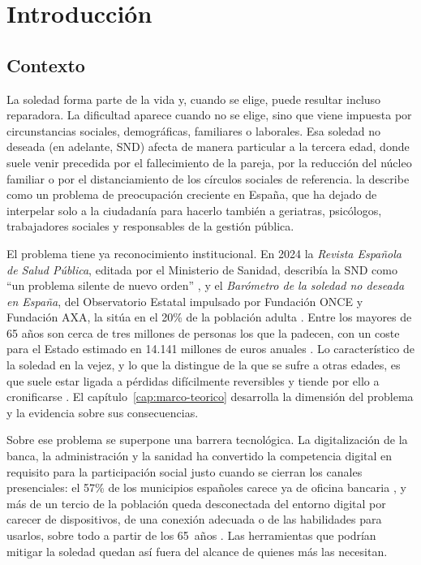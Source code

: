\chapter{Introducción}
\label{cap:introduccion}

\section{Contexto}
\label{contexto}

La soledad forma parte de la vida y, cuando se elige, puede resultar incluso reparadora. La dificultad aparece cuando no se elige, sino que viene impuesta por circunstancias sociales, demográficas, familiares o laborales. Esa soledad no deseada (en adelante, SND) afecta de manera particular a la tercera edad, donde suele venir precedida por el fallecimiento de la pareja, por la reducción del núcleo familiar o por el distanciamiento de los círculos sociales de referencia. \textcite{RuedaEstrada2018} la describe como un problema de preocupación creciente en España, que ha dejado de interpelar solo a la ciudadanía para hacerlo también a geriatras, psicólogos, trabajadores sociales y responsables de la gestión pública.

El problema tiene ya reconocimiento institucional. En 2024 la \textit{Revista Española de Salud Pública}, editada por el Ministerio de Sanidad, describía la SND como \enquote{un problema silente de nuevo orden} \citep{JimenezRodriguez2024}, y el \textit{Barómetro de la soledad no deseada en España}, del Observatorio Estatal impulsado por Fundación ONCE y Fundación AXA, la sitúa en el 20\% de la población adulta \citep{SoledadES}. Entre los mayores de 65 años son cerca de tres millones de personas los que la padecen, con un coste para el Estado estimado en 14.141 millones de euros anuales \citep{Senara}. Lo característico de la soledad en la vejez, y lo que la distingue de la que se sufre a otras edades, es que suele estar ligada a pérdidas difícilmente reversibles y tiende por ello a cronificarse \citep{FundacionONCE}. El capítulo~\ref{cap:marco-teorico} desarrolla la dimensión del problema y la evidencia sobre sus consecuencias.

Sobre ese problema se superpone una barrera tecnológica. La digitalización de la banca, la administración y la sanidad ha convertido la competencia digital en requisito para la participación social justo cuando se cierran los canales presenciales: el 57\% de los municipios españoles carece ya de oficina bancaria \citep{RevistaByte}, y más de un tercio de la población queda desconectada del entorno digital por carecer de dispositivos, de una conexión adecuada o de las habilidades para usarlos, sobre todo a partir de los 65~años \citep{espanol}. Las herramientas que podrían mitigar la soledad quedan así fuera del alcance de quienes más las necesitan.

